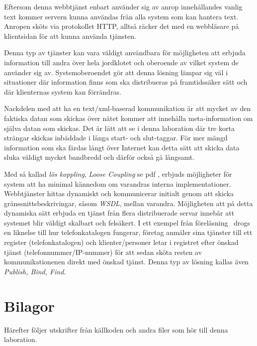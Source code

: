 \documentclass[a4paper, 12pt]{article}
\begin{document}
Eftersom denna webbtjänst enbart använder sig av anrop innehållandes
vanlig text kommer servern kunna användas från alla system som kan
hantera text. Anropen sköts via protokollet HTTP, alltså räcker det
med en webbläsare på klientsidan för att kunna använda tjänsten.

Denna typ av tjänster kan vara väldigt användbara för möjligheten att
erbjuda information till andra över hela jordklotet och oberoende av
vilket system de använder sig av. Systemoberoendet gör att denna
lösning lämpar sig väl i situationer där information finns som ska
distribueras på framtidssäker sätt och där klienternas system kan
förrändras.

Nackdelen med att ha en text/xml-baserad kommunikation är att mycket
av den faktiska datan som skickas över nätet kommer att innehålla
meta-information om själva datan som skickas. Det är lätt att se i
denna laboration där tre korta strängar skickas inbäddade i långa
start- och slut-taggar. För mer mängd information som ska färdas långt
över Internet kan detta sätt att skicka data sluka väldigt mycket
bandbredd och därför också gå långsamt.

Med så kallad \textit{lös koppling}, \textit{Loose Coupling} se pdf
\cite{web:po}, erbjuds möjligheter för system att ha minimal kännedom
om varandras interna implementationer. Webbtjänster hittas dynamiskt
och kommunicerar initialt genom att skicka gränssnittsbeskrivingar,
såsom \textit{WSDL}, mellan varandra. Möjligheten att på detta
dynamiska sätt erbjuda en tjänst från flera distribuerade servar
innebär att systemet blir väldigt skalbart och felsäkert. I ett
exempel från föreläsning~\cite{lec:po} drogs en liknelse till hur
telefonkatalogen fungerar, företag anmäler sina tjänster till ett
register (telefonkatalogen) och klienter/personer letar i registret
efter önskad tjänst (telefonnummer/IP-nummer) för att sedan sköta
resten av kommunikationenen direkt med önskad tjänst. Denna typ av
lösning kallas även \textit{Publish, Bind, Find}.




\newpage
\appendix
{}
\section{Bilagor}\label{Bilagor}
Härefter följer utskrifter från källkoden och andra filer som hör till
denna laboration.
\end{document}

